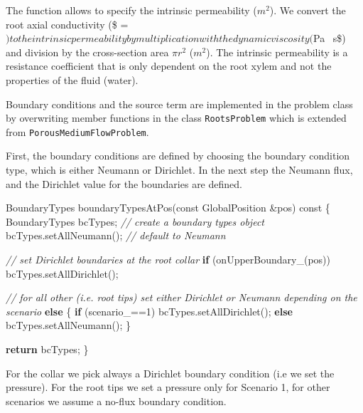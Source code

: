 \documentclass[11pt]{article}
\newenvironment{Shaded}{}{}
\newcommand{\DecValTok}[1]{\textcolor[rgb]{0.25,0.63,0.44}{{#1}}}
\newcommand{\CommentTok}[1]{\textcolor[rgb]{0.38,0.63,0.69}{\textit{{#1}}}}
\newcommand{\NormalTok}[1]{{#1}}
\newcommand{\VariableTok}[1]{\textcolor[rgb]{0.10,0.09,0.49}{{#1}}}
\newcommand{\ControlFlowTok}[1]{\textcolor[rgb]{0.00,0.44,0.13}{\textbf{{#1}}}}
\newcommand{\AttributeTok}[1]{\textcolor[rgb]{0.49,0.56,0.16}{{#1}}}
\begin{document}
    The function allows to specify the intrinsic permeability (\(m^2\)). We
convert the root axial conductivity (\$ =
\() to the intrinsic permeability by multiplication with the dynamic viscosity (\)Pa
~s\$) and division by the cross-section area \(\pi r^2\) (\(m^2\)). The
intrinsic permeability is a resistance coefficient that is only
dependent on the root xylem and not the properties of the fluid (water).

    Boundary conditions and the source term are implemented in the problem
class by overwriting member functions in the class \texttt{RootsProblem}
which is extended from \texttt{PorousMediumFlowProblem}.

First, the boundary conditions are defined by choosing the boundary
condition type, which is either Neumann or Dirichlet. In the next step
the Neumann flux, and the Dirichlet value for the boundaries are
defined.

    \begin{Shaded}
\begin{Highlighting}[]
\NormalTok{BoundaryTypes boundaryTypesAtPos(}\AttributeTok{const}\NormalTok{ GlobalPosition &pos) }\AttributeTok{const}
\NormalTok{\{}
\NormalTok{    BoundaryTypes bcTypes; }\CommentTok{// create a boundary types object}
\NormalTok{    bcTypes.setAllNeumann(); }\CommentTok{// default to Neumann}

    \CommentTok{// set Dirichlet boundaries at the root collar}
    \ControlFlowTok{if}\NormalTok{ (}\VariableTok{onUpperBoundary_}\NormalTok{(pos))}
\NormalTok{        bcTypes.setAllDirichlet();}

    \CommentTok{// for all other (i.e. root tips) set either Dirichlet or Neumann depending on the scenario}
    \ControlFlowTok{else}
\NormalTok{    \{ }
        \ControlFlowTok{if}\NormalTok{ (}\VariableTok{scenario_}\NormalTok{==}\DecValTok{1}\NormalTok{)}
\NormalTok{            bcTypes.setAllDirichlet();}
        \ControlFlowTok{else}
\NormalTok{            bcTypes.setAllNeumann();}
\NormalTok{    \}}
    
    \ControlFlowTok{return}\NormalTok{ bcTypes;}
\NormalTok{\}}
\end{Highlighting}
\end{Shaded}

    For the collar we pick always a Dirichlet boundary condition (i.e we set
the pressure). For the root tips we set a pressure only for Scenario 1,
for other scenarios we assume a no-flux boundary condition.
\end{document}
